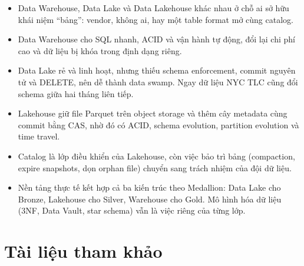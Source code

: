 \documentclass[12pt]{article}
\begin{document}
\begin{itemize}
    \item Data Warehouse, Data Lake và Data Lakehouse khác nhau ở chỗ ai sở hữu khái niệm ``bảng'': vendor, không ai, hay một table format mở cùng catalog.
    \item Data Warehouse cho SQL nhanh, ACID và vận hành tự động, đổi lại chi phí cao và dữ liệu bị khóa trong định dạng riêng.
    \item Data Lake rẻ và linh hoạt, nhưng thiếu schema enforcement, commit nguyên tử và DELETE, nên dễ thành data swamp. Ngay dữ liệu NYC TLC cũng đổi schema giữa hai tháng liên tiếp.
    \item Lakehouse giữ file Parquet trên object storage và thêm cây metadata cùng commit bằng CAS, nhờ đó có ACID, schema evolution, partition evolution và time travel.
    \item Catalog là lớp điều khiển của Lakehouse, còn việc bảo trì bảng (compaction, expire snapshots, dọn orphan file) chuyển sang trách nhiệm của đội dữ liệu.
    \item Nền tảng thực tế kết hợp cả ba kiến trúc theo Medallion: Data Lake cho Bronze, Lakehouse cho Silver, Warehouse cho Gold. Mô hình hóa dữ liệu (3NF, Data Vault, star schema) vẫn là việc riêng của từng lớp.
\end{itemize}

\glsaddall
\printnoidxglossary[style=clean3col, sort=def, title={Bảng thuật ngữ}, toctitle={Bảng thuật ngữ}]

\section{Tài liệu tham khảo}
\printbibliography[heading=none]
\end{document}
